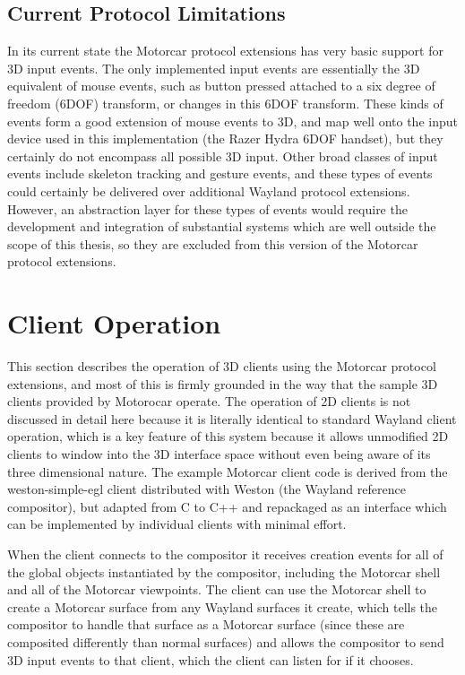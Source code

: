\subsection{Current Protocol Limitations}
In its current state the Motorcar protocol extensions has very basic support for 3D input events. The only implemented input events are essentially the 3D equivalent of mouse events, such as button pressed attached to a six degree of freedom (6DOF) transform, or changes in this 6DOF transform. These kinds of events form a good extension of mouse events to 3D, and map well onto the input device used in this implementation (the Razer Hydra 6DOF handset), but they certainly do not encompass all possible 3D input. Other broad classes of input events include skeleton tracking and gesture events, and these types of events could certainly be delivered over additional Wayland protocol extensions. However, an abstraction layer for these types of events would require the development and integration of substantial systems which are well outside the scope of this thesis, so they are excluded from this version of the Motorcar protocol extensions.

\section{Client Operation}

This section describes the operation of 3D clients using the Motorcar protocol extensions, and most of this is firmly grounded in the way that the sample 3D clients provided by Motorocar operate. The operation of 2D clients is not discussed in detail here because it is literally identical to standard Wayland client operation, which is a key feature of this system because it allows unmodified 2D clients to window into the 3D interface space without even being aware of its three dimensional nature. The example Motorcar client code is derived from the weston-simple-egl client distributed with Weston (the Wayland reference compositor), but adapted from C to C++ and repackaged as an interface which can be implemented by individual clients with minimal effort.

When the client connects to the compositor it receives creation events for all of the global objects instantiated by the compositor, including the Motorcar shell and all of the Motorcar viewpoints. The client can use the Motorcar shell to create a Motorcar surface from any Wayland surfaces it create, which tells the compositor to handle that surface as a Motorcar surface (since these are composited differently than normal surfaces) and allows the compositor to send 3D input events to that client, which the client can listen for if it chooses. 

